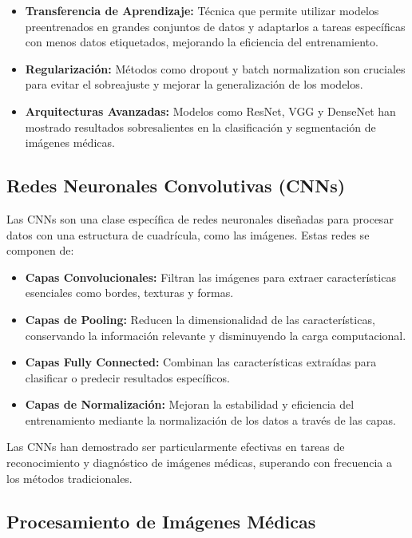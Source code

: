 \begin{itemize}
 \item \textbf{Transferencia de Aprendizaje:} Técnica que permite utilizar modelos preentrenados en grandes conjuntos de datos y adaptarlos a tareas específicas con menos datos etiquetados, mejorando la eficiencia del entrenamiento.
 \item \textbf{Regularización:} Métodos como dropout y batch normalization son cruciales para evitar el sobreajuste y mejorar la generalización de los modelos.
 \item \textbf{Arquitecturas Avanzadas:} Modelos como ResNet, VGG y DenseNet han mostrado resultados sobresalientes en la clasificación y segmentación de imágenes médicas.
\end{itemize}

\subsection{Redes Neuronales Convolutivas (CNNs)}

Las CNNs son una clase específica de redes neuronales diseñadas para procesar datos con una estructura de cuadrícula, como las imágenes. Estas redes se componen de:

\begin{itemize}
 \item \textbf{Capas Convolucionales:} Filtran las imágenes para extraer características esenciales como bordes, texturas y formas.
 \item \textbf{Capas de Pooling:} Reducen la dimensionalidad de las características, conservando la información relevante y disminuyendo la carga computacional.
 \item \textbf{Capas Fully Connected:} Combinan las características extraídas para clasificar o predecir resultados específicos.
 \item \textbf{Capas de Normalización:} Mejoran la estabilidad y eficiencia del entrenamiento mediante la normalización de los datos a través de las capas.
\end{itemize}

Las CNNs han demostrado ser particularmente efectivas en tareas de reconocimiento y diagnóstico de imágenes médicas, superando con frecuencia a los métodos tradicionales.

\subsection{Procesamiento de Imágenes Médicas}

